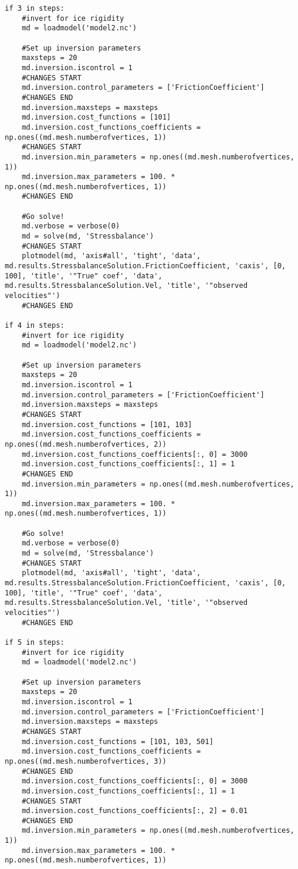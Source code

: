 \begin{lstlisting}
if 3 in steps:
    #invert for ice rigidity
    md = loadmodel('model2.nc')

    #Set up inversion parameters
    maxsteps = 20
    md.inversion.iscontrol = 1
    #CHANGES START
    md.inversion.control_parameters = ['FrictionCoefficient']
    #CHANGES END
    md.inversion.maxsteps = maxsteps
    md.inversion.cost_functions = [101]
    md.inversion.cost_functions_coefficients = np.ones((md.mesh.numberofvertices, 1))
    #CHANGES START
    md.inversion.min_parameters = np.ones((md.mesh.numberofvertices, 1))
    md.inversion.max_parameters = 100. * np.ones((md.mesh.numberofvertices, 1))
    #CHANGES END

    #Go solve!
    md.verbose = verbose(0)
    md = solve(md, 'Stressbalance')
    #CHANGES START
    plotmodel(md, 'axis#all', 'tight', 'data', md.results.StressbalanceSolution.FrictionCoefficient, 'caxis', [0, 100], 'title', '"True" coef', 'data', md.results.StressbalanceSolution.Vel, 'title', '"observed velocities"')
    #CHANGES END

if 4 in steps:
    #invert for ice rigidity
    md = loadmodel('model2.nc')

    #Set up inversion parameters
    maxsteps = 20
    md.inversion.iscontrol = 1
    md.inversion.control_parameters = ['FrictionCoefficient']
    md.inversion.maxsteps = maxsteps
    #CHANGES START
    md.inversion.cost_functions = [101, 103]
    md.inversion.cost_functions_coefficients = np.ones((md.mesh.numberofvertices, 2))
    md.inversion.cost_functions_coefficients[:, 0] = 3000
    md.inversion.cost_functions_coefficients[:, 1] = 1
    #CHANGES END
    md.inversion.min_parameters = np.ones((md.mesh.numberofvertices, 1))
    md.inversion.max_parameters = 100. * np.ones((md.mesh.numberofvertices, 1))

    #Go solve!
    md.verbose = verbose(0)
    md = solve(md, 'Stressbalance')
    #CHANGES START
    plotmodel(md, 'axis#all', 'tight', 'data', md.results.StressbalanceSolution.FrictionCoefficient, 'caxis', [0, 100], 'title', '"True" coef', 'data', md.results.StressbalanceSolution.Vel, 'title', '"observed velocities"')
    #CHANGES END

if 5 in steps:
    #invert for ice rigidity
    md = loadmodel('model2.nc')

    #Set up inversion parameters
    maxsteps = 20
    md.inversion.iscontrol = 1
    md.inversion.control_parameters = ['FrictionCoefficient']
    md.inversion.maxsteps = maxsteps
    #CHANGES START
    md.inversion.cost_functions = [101, 103, 501]
    md.inversion.cost_functions_coefficients = np.ones((md.mesh.numberofvertices, 3))
    #CHANGES END
    md.inversion.cost_functions_coefficients[:, 0] = 3000
    md.inversion.cost_functions_coefficients[:, 1] = 1
    #CHANGES START
    md.inversion.cost_functions_coefficients[:, 2] = 0.01
    #CHANGES END
    md.inversion.min_parameters = np.ones((md.mesh.numberofvertices, 1))
    md.inversion.max_parameters = 100. * np.ones((md.mesh.numberofvertices, 1))


\end{lstlisting}
